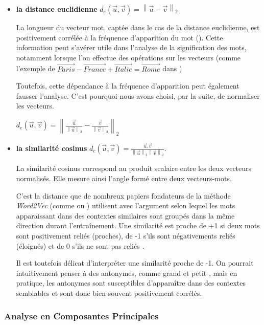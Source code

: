 \documentclass[11pt,french,french]{article}
\begin{document}
\begin{itemize}
\item \textbf{la distance euclidienne} $ d_{e}(\vec{u},\vec{v}) = \left\| \vec{u} - \vec{v}  \right\|_2$

La longueur du vecteur mot, captée dans le cas de la distance euclidienne, est positivement corrélée à la fréquence d'apparition du mot (\cite{Schakel}). Cette information peut s'avérer utile dans l'analyse de la signification des mots, notamment lorsque l'on effectue des opérations sur les vecteurs (comme l'exemple de $\overrightarrow{Paris} - \overrightarrow{France} + \overrightarrow{Italie} = \overrightarrow{Rome}$ dans \cite{Mikolov})

Toutefois, cette dépendance à la fréquence d'apparition peut également fausser l'analyse. C'est pourquoi nous avons choisi, par la suite, de normaliser les vecteurs. 

$ d_{e}(\vec{u},\vec{v}) = \left\| \frac{\vec{u}}{\left\| \vec{u} \right\|_2} - \frac{\vec{v}}{\left\| \vec{v} \right\|_2}  \right\|_2$


\item \textbf{la similarité cosinus} $ d_{c}(\vec{u}, \vec{v}) = \frac{\vec{u}.\vec{v}}{\left\| \vec{u} \right\|_2  \left\| \vec{v} \right\|_2 }$.

La similarité cosinus correspond au produit scalaire entre les deux vecteurs normalisés. Elle mesure ainsi l'angle formé entre deux vecteurs-mots.

C'est la distance que de nombreux papiers fondateurs de la méthode \emph{Word2Vec} (comme \cite{Mikolov} ou \cite{Levy}) utilisent avec l'argument selon lequel les mots apparaissant dans des contextes similaires sont groupés dans la même direction durant l'entraînement. 
Une similarité est proche de +1 si deux mots sont positivement reliés (proches), de -1 s'ils sont négativements reliés (éloignés) et de 0 s'ils ne sont pas \og reliés \fg. 

Il est toutefois délicat d'interpréter une similarité proche de -1. On pourrait intuitivement penser à des antonymes, comme \og grand \fg et \og petit \fg, mais en pratique, les antonymes sont susceptibles d'apparaître dans des contextes semblables et sont donc bien souvent positivement corrélés. 

 
\end{itemize}

\hypertarget{analyse-en-composantes-principales}{%
\subsubsection{Analyse en Composantes
Principales}\label{analyse-en-composantes-principales}}
\end{document}
